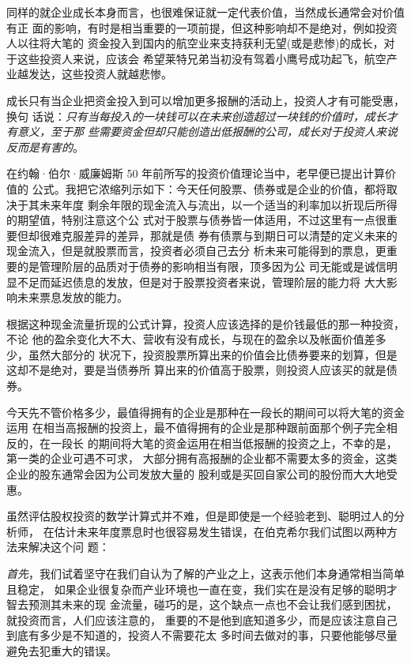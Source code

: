 \documentclass[UTF8,a4paper,zihao=-4,fontset = windows]{ctexart} %
\begin{document}
同样的就企业成长本身而言，也很难保证就一定代表价值，当然成长通常会对价值有正
面的影响，有时是相当重要的一项前提，但这种影响却不是绝对，例如投资人以往将大笔的
资金投入到国内的航空业来支持获利无望(或是悲惨)的成长，对于这些投资人来说，应该会
希望莱特兄弟当初没有驾着小鹰号成功起飞，航空产业越发达，这些投资人就越悲惨。

成长只有当企业把资金投入到可以增加更多报酬的活动上，投资人才有可能受惠，换句
话说：\textit{只有当每投入的一块钱可以在未来创造超过一块钱的价值时，成长才有意义，至于那
些需要资金但却只能创造出低报酬的公司，成长对于投资人来说反而是有害的}。

在约翰·伯尔·威廉姆斯 50 年前所写的投资价值理论当中，老早便已提出计算价值的
公式。我把它浓缩列示如下：今天任何股票、债券或是企业的价值，都将取决于其未来年度
剩余年限的现金流入与流出，以一个适当的利率加以折现后所得的期望值，特别注意这个公
式对于股票与债券皆一体适用，不过这里有一点很重要但却很难克服差异的差异，那就是债
券有债票与到期日可以清楚的定义未来的现金流入，但是就股票而言，投资者必须自己去分
析未来可能得到的票息，更重要的是管理阶层的品质对于债券的影响相当有限，顶多因为公
司无能或是诚信明显不足而延迟债息的发放，但是对于股票投资者来说，管理阶层的能力将
大大影响未来票息发放的能力。

根据这种现金流量折现的公式计算，投资人应该选择的是价钱最低的那一种投资，不论
他的盈余变化大不大、营收有没有成长，与现在的盈余以及帐面价值差多少，虽然大部分的
状况下，投资股票所算出来的价值会比债券要来的划算，但是这却不是绝对，要是当债券所
算出来的价值高于股票，则投资人应该买的就是债券。

今天先不管价格多少，最值得拥有的企业是那种在一段长的期间可以将大笔的资金运用
在相当高报酬的投资上，最不值得拥有的企业是那种跟前面那个例子完全相反的，在一段长
的期间将大笔的资金运用在相当低报酬的投资之上，不幸的是，第一类的企业可遇不可求，
大部分拥有高报酬的企业都不需要太多的资金，这类企业的股东通常会因为公司发放大量的
股利或是买回自家公司的股份而大大地受惠。

虽然评估股权投资的数学计算式并不难，但是即使是一个经验老到、聪明过人的分析师，
在估计未来年度票息时也很容易发生错误，在伯克希尔我们试图以两种方法来解决这个问
题：

\textit{首先}，我们试着坚守在我们自认为了解的产业之上，这表示他们本身通常相当简单且稳定，
如果企业很复杂而产业环境也一直在变，我们实在是没有足够的聪明才智去预测其未来的现
金流量，碰巧的是，这个缺点一点也不会让我们感到困扰，就投资而言，人们应该注意的，
重要的不是他到底知道多少，而是应该注意自己到底有多少是不知道的，投资人不需要花太
多时间去做对的事，只要他能够尽量避免去犯重大的错误。
\end{document}
